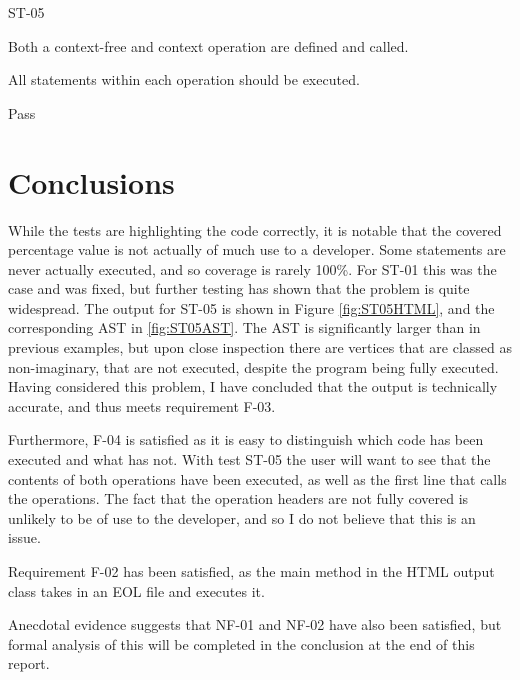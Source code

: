 \begin{samepage}
\begin{description}[style=sameline,leftmargin=3.5cm,nolistsep]
\item[\hspace*{0.3cm}Label] ST-05
\item[\hspace*{0.3cm}Description] Both a context-free and context operation are defined and called.
\item[\hspace*{0.3cm}Expected Output] All statements within each operation should be executed.
\item[\hspace*{0.3cm}Result] Pass
\end{description}
\end{samepage}

\section{Conclusions}

While the tests are highlighting the code correctly, it is notable that the covered percentage value is not actually of much use to a developer. Some statements are never actually executed, and so coverage is rarely 100\%. For ST-01 this was the case and was fixed, but further testing has shown that the problem is quite widespread. The output for ST-05 is shown in Figure \ref{fig:ST05HTML}, and the corresponding AST in \ref{fig:ST05AST}. The AST is significantly larger than in previous examples, but upon close inspection there are vertices that are classed as non-imaginary, that are not executed, despite the program being fully executed. Having considered this problem, I have concluded that the output is technically accurate, and thus meets requirement F-03. 

Furthermore, F-04 is satisfied as it is easy to distinguish which code has been executed and what has not. With test ST-05 the user will want to see that the contents of both operations have been executed, as well as the first line that calls the operations. The fact that the operation headers are not fully covered is unlikely to be of use to the developer, and so I do not believe that this is an issue.

Requirement F-02 has been satisfied, as the main method in the HTML output class takes in an EOL file and executes it. 

Anecdotal evidence suggests that NF-01 and NF-02 have also been satisfied, but formal analysis of this will be completed in the conclusion at the end of this report.

